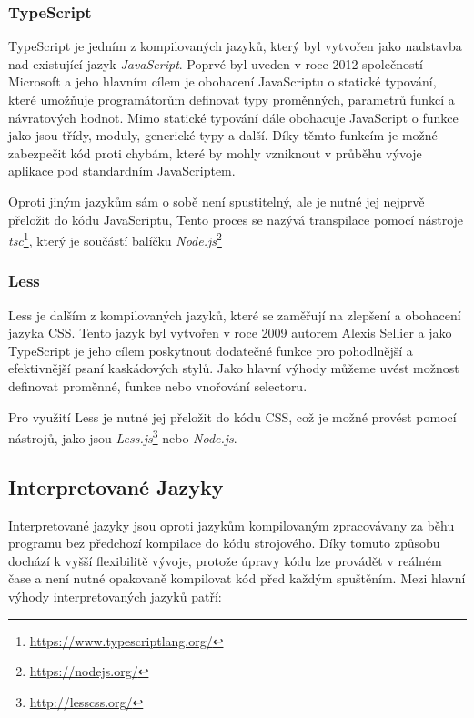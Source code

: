 \subsubsection*{TypeScript}
\label{subsubsec:languages-compiled-typescript}
TypeScript je jedním z kompilovaných jazyků, který byl vytvořen jako nadstavba nad existující jazyk \textit{JavaScript}. Poprvé byl uveden v roce 2012 společností Microsoft a jeho hlavním cílem je obohacení JavaScriptu o statické typování, které umožňuje programátorům definovat typy proměnných, parametrů funkcí a návratových hodnot. Mimo statické typování dále obohacuje JavaScript o funkce jako jsou třídy, moduly, generické typy a další. Díky těmto funkcím je možné zabezpečit kód proti chybám, které by mohly vzniknout v průběhu vývoje aplikace pod standardním JavaScriptem.

Oproti jiným jazykům sám o sobě není spustitelný, ale je nutné jej nejprvě přeložit do kódu JavaScriptu, Tento proces se nazývá transpilace pomocí nástroje \textit{tsc}\footnote{\href{https://www.typescriptlang.org/}{https://www.typescriptlang.org/}}, který je součástí balíčku \textit{Node.js}\footnote{\href{https://nodejs.org/}{https://nodejs.org/}}

\subsubsection*{Less}
\label{subsubsec:languages-compiled-less}
Less je dalším z kompilovaných jazyků, které se zaměřují na zlepšení a obohacení jazyka CSS. Tento jazyk byl vytvořen v roce 2009 autorem Alexis Sellier a jako TypeScript je jeho cílem poskytnout dodatečné funkce pro pohodlnější a efektivnější psaní kaskádových stylů. Jako hlavní výhody můžeme uvést možnost definovat proměnné, funkce nebo vnořování selectoru.

Pro využití Less je nutné jej přeložit do kódu CSS, což je možné provést pomocí nástrojů, jako jsou \textit{Less.js}\footnote{\href{http://lesscss.org/}{http://lesscss.org/}} nebo \textit{Node.js}.

\subsection{Interpretované Jazyky}
\label{subsec:languages-interpreted}
Interpretované jazyky jsou oproti jazykům kompilovaným zpracovávany za běhu programu bez předchozí kompilace do kódu strojového. Díky tomuto způsobu dochází k vyšší flexibilitě vývoje, protože úpravy kódu lze provádět v reálném čase a není nutné opakovaně kompilovat kód před každým spuštěním. Mezi hlavní výhody interpretovaných jazyků patří:

